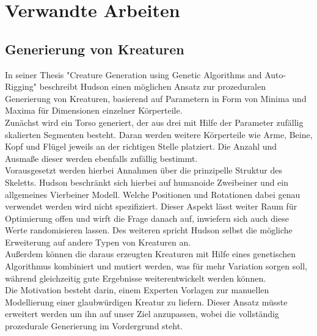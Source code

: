\chapter{Verwandte Arbeiten}
\label{Verwandte_Arbeiten}


\section{Generierung von Kreaturen}
In seiner Thesis "Creature Generation using Genetic Algorithms and Auto-Rigging" \cite{Hudson2013CreatureGU} beschreibt Hudson einen möglichen Ansatz zur prozeduralen Generierung von Kreaturen, basierend auf Parametern in Form von Minima und Maxima für Dimensionen einzelner Körperteile.\\ Zunächst wird ein Torso generiert, der aus drei mit Hilfe der Parameter zufällig skalierten Segmenten besteht. Daran werden weitere Körperteile wie Arme, Beine, Kopf und Flügel jeweils an der richtigen Stelle platziert. Die Anzahl und Ausmaße dieser werden ebenfalls zufällig bestimmt.\\
Vorausgesetzt werden hierbei Annahmen über die prinzipelle Struktur des Skeletts. Hudson beschränkt sich hierbei auf humanoide Zweibeiner und ein allgemeines Vierbeiner Modell. Welche Positionen und Rotationen dabei genau verwendet werden wird nicht spezifiziert. Dieser Aspekt lässt weiter Raum für Optimierung offen und wirft die Frage danach auf, inwiefern sich auch diese Werte randomisieren lassen. Des weiteren spricht Hudson selbst die mögliche Erweiterung auf andere Typen von Kreaturen an.\\
Außerdem können die daraus erzeugten Kreaturen mit Hilfe eines genetischen Algorithmus kombiniert und mutiert werden, was für mehr Variation sorgen soll, während gleichzeitig gute Ergebnisse weiterentwickelt werden können.\\
Die Motivation besteht darin, einem Experten Vorlagen zur manuellen Modellierung einer glaubwürdigen Kreatur zu liefern. Dieser Ansatz müsste erweitert werden um ihn auf unser Ziel anzupassen, wobei die vollständig prozedurale Generierung im Vordergrund steht.

